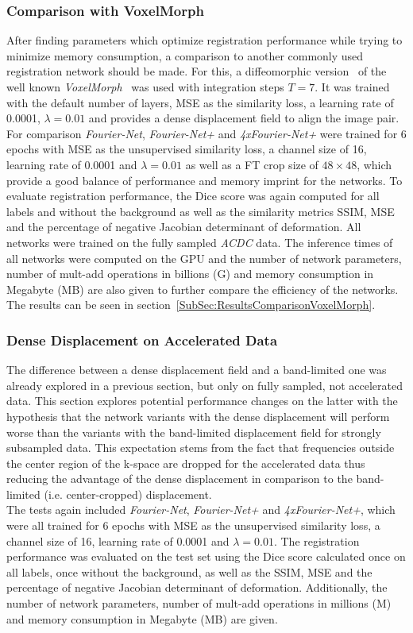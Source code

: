 \subsubsection{Comparison with VoxelMorph} \label{SubSubSec:ComparisonVoxelMorph}
After finding parameters which optimize registration performance while trying to minimize memory consumption, a comparison to another commonly used registration network should be made. For this, a diffeomorphic version~\cite{VoxelMorphDiff} of the well known \emph{VoxelMorph}~\cite{Voxelmorph} was used with integration steps $T=7$. It was trained with the default number of layers, MSE as the similarity loss, a learning rate of 0.0001, $\lambda=0.01$ and provides a dense displacement field to align the image pair. For comparison \emph{Fourier-Net}, \emph{Fourier-Net+} and \emph{4xFourier-Net+} were trained for 6 epochs with MSE as the unsupervised similarity loss, a channel size of 16, learning rate of 0.0001 and $\lambda=0.01$ as well as a FT crop size of $48 \times 48$, which provide a good balance of performance and memory imprint for the networks. To evaluate registration performance, the Dice score was again computed for all labels and without the background as well as the similarity metrics SSIM, MSE and the percentage of negative Jacobian determinant of deformation. All networks were trained on the fully sampled \emph{ACDC} data. The inference times of all networks were computed on the GPU and the number of network parameters, number of mult-add operations in billions (G) and memory consumption in Megabyte (MB) are also given to further compare the efficiency of the networks. The results can be seen in section~\ref{SubSec:ResultsComparisonVoxelMorph}.


\subsubsection{Dense Displacement on Accelerated Data} \label{SubSubSec:DenseDisplacementAcc}
The difference between a dense displacement field and a band-limited one was already explored in a previous section, but only on fully sampled, not accelerated data. This section explores potential performance changes on the latter with the hypothesis that the network variants with the dense displacement will perform worse than the variants with the band-limited displacement field for strongly subsampled data. This expectation stems from the fact that frequencies outside the center region of the k-space are dropped for the accelerated data thus reducing the advantage of the dense displacement in comparison to the band-limited (i.e. center-cropped) displacement. \\
The tests again included \emph{Fourier-Net}, \emph{Fourier-Net+} and \emph{4xFourier-Net+}, which were all trained for 6 epochs with MSE as the unsupervised similarity loss, a channel size of 16, learning rate of 0.0001 and $\lambda=0.01$. The registration performance was evaluated on the test set using the Dice score calculated once on all labels, once without the background, as well as the SSIM, MSE and the percentage of negative Jacobian determinant of deformation. Additionally, the number of network parameters, number of mult-add operations in millions (M) and memory consumption in Megabyte (MB) are given.

